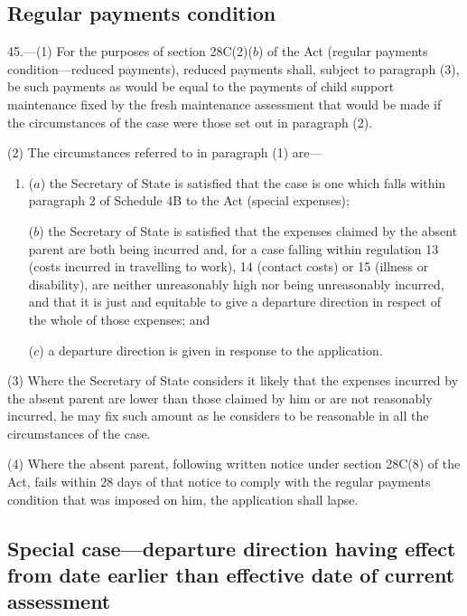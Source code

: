\documentclass[12pt,a4paper]{article}
\begin{document}
\subsection[45. Regular payments condition]{Regular payments condition}

45.—(1) For the purposes of section
28C(2)($b$) of the Act (regular payments condition—reduced payments), reduced
payments shall, subject to paragraph (3), be such payments as would be equal to
the payments of child support maintenance fixed by the fresh maintenance
assessment that would be made if the circumstances of the case were those set
out in paragraph (2).

(2) The circumstances referred to in paragraph (1) are—
\begin{enumerate}\item[]
($a$) the Secretary of State is satisfied that the case is one which falls within
paragraph 2 of Schedule 4B to the Act (special expenses);

($b$) the Secretary of State is satisfied that the expenses claimed by the absent
parent are both being incurred and, for a case falling within regulation 13
(costs incurred in travelling to work), 14 (contact costs) or 15 (illness or
disability), are neither unreasonably high nor being unreasonably incurred, and
that it is just and equitable to give a departure direction in respect of the
whole of those expenses; and

($c$) a departure direction is given in response to the application.
\end{enumerate}

(3) Where the Secretary of State considers it likely that the expenses incurred
by the absent parent are lower than those claimed by him or are not reasonably
incurred, he may fix such amount as he considers to be reasonable in all the
circumstances of the case.

(4) Where the absent parent, following written notice under section 28C(8) of
the Act, fails within 28 days of that notice to comply with the regular payments
condition that was imposed on him, the application shall lapse.

\subsection[46. Special case—departure direction having effect from date earlier than effective
date of current assessment]{Special case—departure direction having effect from date earlier than effective
date of current assessment}
\end{document}
